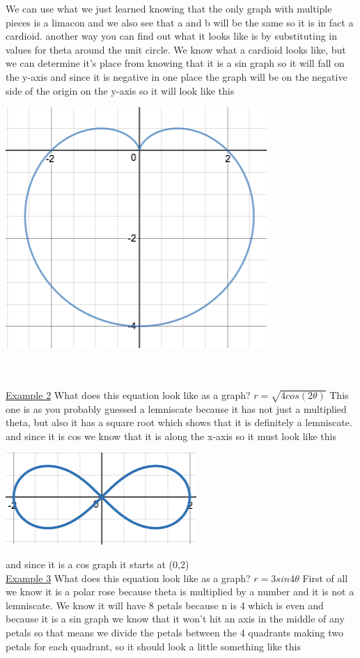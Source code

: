 \documentclass[a4paper,openright, 14pt]{article}
\begin{document}
We can use what we just learned knowing that the only graph with multiple pieces is a limacon and we also see that a and b will be the same so it is in fact a cardioid. another way you can find out what it looks like is by substituting in values for theta around the unit circle. We know what a cardioid looks like, but we can determine it's place from knowing that it is a sin graph so it will fall on the y-axis and since it is negative in one place the graph will be on the negative side of the origin on the y-axis so it will look like this \begin{center}
\includegraphics[width = 5.5 cm, height = 5 cm]{ALEX1.png}
\end{center}\\
\\\underline{Example 2}
What does this equation look like as a graph? $r=\sqrt{4cos(2\theta)}$ This one is as you probably guessed a lemniscate because it has not just a multiplied theta, but also it has a square root which shows that it is definitely a lemniscate. and since it is cos we know that it is along the x-axis so it must look like this  \begin{center}
\includegraphics[width = 8 cm, height = 5 cm]{ALEX2.png}
\end{center}
and since it is a cos graph it starts at (0,2)
\\\underline{Example 3}
What does this equation look like as a graph? $r=3sin4\theta$ 
First of all we know it is a polar rose because theta is multiplied by a number and it is not a lemniscate. We know it will have 8 petals because n is 4 which is even and because it is a sin graph we know that it won't hit an axis in the middle of any petals so that means we divide the petals between the 4 quadrants making two petals for each quadrant, so it should look a little something like this 
\end{document}
